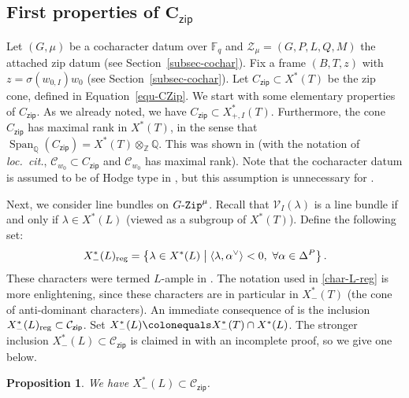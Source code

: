 \documentclass[11pt]{amsart}
\numberwithin{equation}{section}
\newtheorem{proposition}[theorem]{Proposition}
\theoremstyle{definition}
\theoremstyle{remark}
\newcommand{\GZip}{\mathop{\text{$G$-{\tt Zip}}}\nolimits}
\newcommand{\zipsf}{\mathsf{zip}}
\newcommand{\Ccal}{{\mathcal C}}
\newcommand{\Vcal}{{\mathcal V}}
\newcommand{\Zcal}{{\mathcal Z}}
\newcommand{\FF}{\mathbb{F}}
\newcommand{\QQ}{\mathbb{Q}}
\newcommand{\ZZ}{\mathbb{Z}}
\DeclareMathOperator{\Span}{Span}
\newcommand{\loccitn}{{\em loc.\ cit.}}
\newcommand{\reg}{{\rm reg}}
\newcommand{\relmiddle}[1]{\mathrel{}\middle#1\mathrel{}}
\begin{document}
\subsection{First properties of $\boldsymbol{C_{\zipsf}}$}
Let $(G,\mu)$ be a cocharacter datum over $\FF_q$ and $\Zcal_{\mu}=(G,P,L,Q,M)$ the attached zip datum (see Section~\ref{subsec-cochar}). Fix a frame $(B,T,z)$ with $z=\sigma(w_{0,I})w_0$ (see Section~\ref{subsec-cochar}). Let $C_{\zipsf}\subset X^*(T)$ be the zip cone, defined in Equation~\eqref{equ-CZip}. We start with some elementary properties of $C_{\zipsf}$. As we already noted, we have $C_{\zipsf}\subset X^*_{+,I}(T)$. Furthermore, the cone $C_{\zipsf}$ has maximal rank in $X^*(T)$, in the sense that $\Span_\QQ(C_{\zipsf})=X^*(T)\otimes_\ZZ \QQ$. This was shown in \cite[Lemma 3.4.2]{Goldring-Koskivirta-Strata-Hasse} (with the notation of \loccitn, $\mathcal{C}_{w_0}\subset C_{\zipsf}$ and $\mathcal{C}_{w_0}$ has maximal rank). Note that the cocharacter datum is assumed to be of Hodge type in \cite[Section~3.4]{Goldring-Koskivirta-Strata-Hasse}, but this assumption is unnecessary for \cite[Lemma 3.4.2]{Goldring-Koskivirta-Strata-Hasse}.

Next, we consider line bundles on $\GZip^\mu$. Recall that $\Vcal_I(\lambda)$ is a line bundle if and only if $\lambda\in X^*(L)$ (viewed as a subgroup of $X^*(T)$). Define the following set:
\begin{equation}\label{char-L-reg}
X^*_{-}(L)_{\reg} = \left\{\lambda\in X^*(L) \relmiddle| \langle \lambda,\alpha^\vee \rangle<0, \ \forall \alpha\in \Delta^P \right\}.
\end{equation}
These characters were termed $L$-ample in \cite[Definition N.5.1]{Goldring-Koskivirta-Strata-Hasse}. The notation used in \eqref{char-L-reg} is more enlightening, since these characters are in particular in $X_{-}^*(T)$ (the cone of anti-dominant characters). 
An immediate consequence of \cite[Theorem 5.1.4]{Koskivirta-Wedhorn-Hasse} is the inclusion $X^*_{-}(L)_{\reg}\subset \Ccal_{\zipsf}$. Set $X^*_{-}(L)\colonequals X^*_{-}(T) \cap X^*(L)$. The stronger inclusion $X^*_{-}(L)\subset \Ccal_{\zipsf} $ is claimed in \cite[Proposition 1.6.1]{Koskivirta-automforms-GZip} with an incomplete proof, so we give one below. 

\begin{proposition}\label{prop-charL}
We have $X^*_{-}(L) \subset \Ccal_{\zipsf}$.
\end{proposition}
\end{document}
